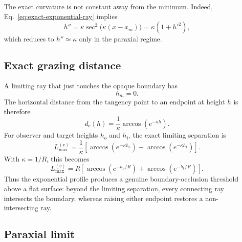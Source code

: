The exact curvature is not constant away from the minimum. Indeed,
Eq.~\eqref{eq:exact-exponential-ray} implies
\begin{equation}
    h''
    =
    \kappa\sec^2\!\bigl(\kappa(x-x_m)\bigr)
    =
    \kappa\left(1+h'^2\right),
    \label{eq:exact-ray-curvature-equation}
\end{equation}
which reduces to $h''\simeq\kappa$ only in the paraxial regime.

\subsection{Exact grazing distance}

A limiting ray that just touches the opaque boundary has
\begin{equation}
    h_m=0.
\end{equation}
The horizontal distance from the tangency point to an endpoint at height $h$
is therefore
\begin{equation}
    d_{\mathrm{e}}(h)
    =
    \frac{1}{\kappa}
    \arccos\!\left(e^{-\kappa h}\right).
    \label{eq:exact-exponential-horizon-distance}
\end{equation}
For observer and target heights $h_{\mathrm{o}}$ and $h_{\mathrm{t}}$, the
exact limiting separation is
\begin{equation}
    L_{\max}^{(\mathrm{e})}
    =
    \frac{1}{\kappa}
    \left[
        \arccos\!\left(e^{-\kappa h_{\mathrm{o}}}\right)
        +
        \arccos\!\left(e^{-\kappa h_{\mathrm{t}}}\right)
    \right].
    \label{eq:exact-exponential-maximum-separation}
\end{equation}
With $\kappa=1/R$, this becomes
\begin{equation}
    L_{\max}^{(\mathrm{e})}
    =
    R
    \left[
        \arccos\!\left(e^{-h_{\mathrm{o}}/R}\right)
        +
        \arccos\!\left(e^{-h_{\mathrm{t}}/R}\right)
    \right].
    \label{eq:exact-earth-scale-separation}
\end{equation}
Thus the exponential profile produces a genuine boundary-occlusion threshold
above a flat surface: beyond the limiting separation, every connecting ray
intersects
the boundary, whereas raising either endpoint restores a non-intersecting
ray.

\subsection{Paraxial limit}

